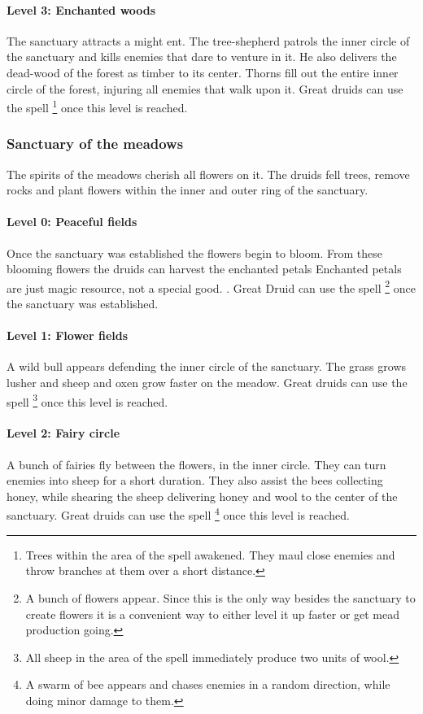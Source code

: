 \paragraph{Level 3: Enchanted woods}
The sanctuary attracts a might ent. The tree-shepherd patrols the inner circle
of the sanctuary and kills enemies that dare to venture in it. He also delivers
the dead-wood of the forest as timber to its center. Thorns fill out the entire
inner circle of the forest, injuring all enemies that walk upon it. Great
druids can use the spell \footnote{ Trees within
	the area of the spell awakened. They maul close enemies and throw branches at
	them over a short distance. } once this level is reached.

\subsubsection{Sanctuary of the meadows}\label{ch:Tribes:Vikings:Religion:Grassland}
The spirits of the meadows cherish all flowers on it. The druids fell trees,
remove rocks and plant flowers within the inner and outer ring of the
sanctuary.

\paragraph{Level 0: Peaceful fields}
Once the sanctuary was established the flowers begin to bloom. From these
blooming flowers the druids can harvest the enchanted petals{ Enchanted petals
		are just magic resource, not a special good. }. Great Druid can use the spell
\footnote{ A bunch of flowers appear. Since this is the only
	way besides the sanctuary to create flowers it is a convenient way to either
	level it up faster or get mead production going. } once the sanctuary was
established.

\paragraph{Level 1: Flower fields}
A wild bull appears defending the inner circle of the sanctuary. The grass
grows lusher and sheep and oxen grow faster on the meadow. Great druids can use
the spell \footnote{ All sheep in the area of the
	spell immediately produce two units of wool. } once this level is reached.

\paragraph{Level 2: Fairy circle}
A bunch of fairies fly between the flowers, in the inner circle. They can turn
enemies into sheep for a short duration. They also assist the bees collecting
honey, while shearing the sheep delivering honey and wool to the center of the
sanctuary. Great druids can use the spell \footnote{ A
	swarm of bee appears and chases enemies in a random direction, while doing
	minor damage to them. } once this level is reached.

